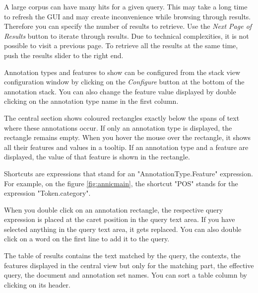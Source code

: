 A large corpus can have many hits for a given query. This may take a long
time to refresh the GUI and may create inconvenience while browsing through
results. Therefore you can specify the number of results to retrieve. Use
the {\em Next Page of Results} button to iterate through results. Due to
technical complexities, it is not possible to visit a previous page. To
retrieve all the results at the same time, push the results slider to the
right end.


Annotation types and features to show can be configured from the stack view
configuration window by clicking on the {\em Configure} button at the bottom
of the annotation stack. You can also change the feature value displayed by
double clicking on the annotation type name in the first column.

The central section shows coloured rectangles exactly below the spans of
text where these annotations occur. If only an annotation type is displayed,
the rectangle remains empty. When you hover the mouse over the rectangle, it
shows all their features and values in a tooltip. If an annotation type and
a feature are displayed, the value of that feature is shown in the
rectangle.

Shortcuts are expressions that stand for an "AnnotationType.Feature"
expression. For example, on the figure \ref{fig:annicmain}, the
shortcut "POS" stands for the expression "Token.category".

When you double click on an annotation rectangle, the respective query
expression is placed at the caret position in the query text area. If you
have selected anything in the query text area, it gets replaced. You can
also double click on a word on the first line to add it to the query.


The table of results contains the text matched by the query, the contexts,
the features displayed in the central view but only for the matching part,
the effective query, the document and annotation set names. You can sort a
table column by clicking on its header.


